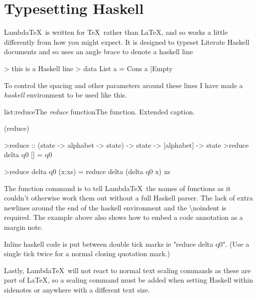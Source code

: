 \section{Typesetting Haskell}

Lambda\TeX\ is written for \TeX\ rather than \LaTeX, and so works a little differently from how you might expect. It is designed to typeset Literate Haskell documents and so uses an angle brace to denote a haskell line

> this is a Haskell line
> data List a = Cons a |Empty

To control the spacing and other parameters around these lines I have made a \emph{haskell} environment to be used like this.


\vspace{-1em}
\begin{listing}{list:reduce}{The \emph{reduce} function}{The  function. Extended caption.}{}
\end{listing}\vspace{-1em}

\functions(reduce)
\begin{haskell}
>reduce :: (state -> alphabet -> state) -> state -> [alphabet] -> state
>reduce delta q0 []     = q0

\vspace{-1.7em}
>reduce delta q0 (x:xs) = reduce delta (delta q0 x) xs

\end{haskell}
\noindent
The function command is to tell Lambda\TeX\ the names of functions as it couldn't otherwise work them out without a full Haskell parser. The lack of extra newlines around the end of the haskell environment and the \textbackslash noindent is required. The example above also shows how to embed a code annotation as a margin note. 

Inline haskell code is put between double tick marks ie "reduce delta q0". (Use a single tick twice for a normal closing quotation mark.) 

Lastly, Lambda\TeX\ will not react to normal text scaling commands as these are part of \LaTeX, so a scaling command must be added when setting Haskell within sidenotes or anywhere with a different text size.


